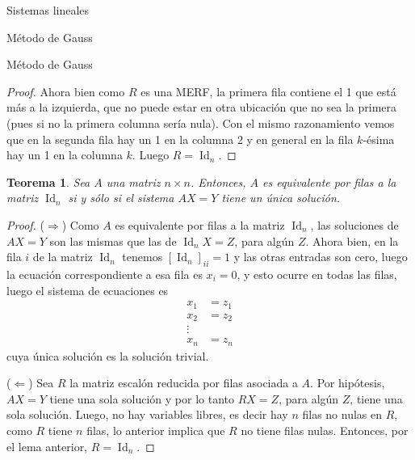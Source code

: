 \documentclass[a4paper,12pt,twoside,spanish,reqno]{amsbook}
\numberwithin{equation}{section}
\newtheorem{teorema}{Teorema}[section]
\theoremstyle{definition}
\theoremstyle{remark}
\newcommand{\Id}{\operatorname{Id}}
\begin{document}
\begin{chapter}{Sistemas lineales}
\begin{section}{Método de Gauss }
\begin{subsection}{Método de Gauss}
\begin{proof}
                    Ahora bien como $R$ es una MERF, la primera fila contiene el 1 que está más a la izquierda, que no puede estar en otra ubicación que no sea la primera (pues si no la primera columna sería nula). Con el mismo razonamiento vemos que en la segunda fila hay un 1 en la columna 2 y en general en la fila $k$-ésima hay un 1 en la columna $k$. Luego $R=\Id_n$.
                \end{proof}			
                
                \begin{teorema}
                    Sea $A$ una matriz $n \times n$. Entonces, $A$ es equivalente por filas a la matriz $\Id_n$  si y sólo si el sistema $AX = Y$ tiene un única solución. 
                \end{teorema}
                \begin{proof}
                    ($\Rightarrow$) Como $A$ es equivalente por filas a la matriz $\Id_n$, las soluciones de $AX =Y$ son las mismas que las de $\Id_nX=Z$, para algún $Z$. Ahora bien,  en la fila $i$ de la matriz $\Id_n$ tenemos $[\Id_n]_{ii} =1$ y las otras entradas son cero, luego la ecuación correspondiente a esa fila es $x _i =0$, y esto ocurre en todas las filas, luego el sistema de ecuaciones es
                    \begin{align*}
                    x_1 &=z_1 \\ x_2 &= z_2 \\ \vdots \\ x_n &= z_n
                    \end{align*}
                    cuya única solución es la solución trivial.
                    
                    ($\Leftarrow$) Sea $R$ la matriz escalón reducida por filas asociada a $A$. Por hipótesis, $AX=Y$ tiene una sola solución y  por lo tanto $RX=Z$, para algún $Z$, tiene una sola solución. Luego, no hay variables libres, es decir hay $n$ filas no nulas en $R$, como $R$ tiene $n$ filas, lo anterior implica que $R$ no tiene filas nulas. Entonces, por el lema anterior, $R=\Id_n$.
                \end{proof}
        
            
            

\end{subsection}
\end{section}
\end{chapter}
\end{document}
